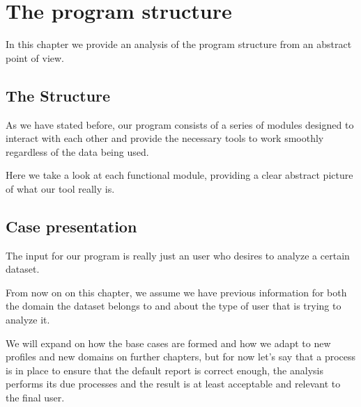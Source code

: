 %
%

\chapter{The program structure}

\begin{resumen}
In this chapter we provide an analysis of the program structure from an abstract point of view.
\end{resumen}


\section{The Structure}
\label{cap2:sec:structure}

As we have stated before, our program consists of a series of modules designed to interact with each other and provide the necessary tools to work smoothly regardless of the data being used.

Here we take a look at each functional module, providing a clear abstract picture of what our tool really is.

\section{Case presentation}
\label{cap2:sec:preparation}

The input for our program is really just an user who desires to analyze a certain dataset.

From now on on this chapter, we assume we have previous information for both the domain the dataset belongs to and about the type of user that is trying to analyze it.

We will expand on how the base cases are formed and how we adapt to new profiles and new domains on further chapters, but for now let's say that a process is in place to ensure that the default report is correct enough, the analysis performs its due processes and the result is at least acceptable and relevant to the final user.

